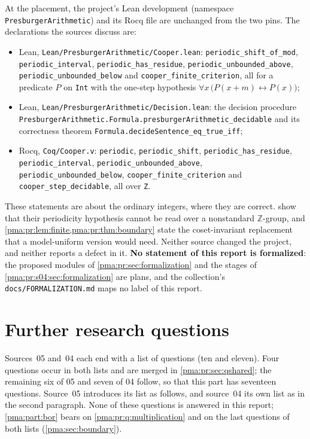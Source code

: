 \documentclass[11pt]{article}
\numberwithin{equation}{section}
\theoremstyle{definition}
\theoremstyle{remark}
\newcommand{\Z}{\mathbb Z}
\newcommand{\fn}[1]{\nolinkurl{#1}}
\begin{document}
At the placement, the project's Lean development (namespace
\texttt{PresburgerArithmetic}) and its Rocq file are unchanged from the two
pins. The declarations the sources discuss are:
\begin{itemize}
\item Lean, \fn{Lean/PresburgerArithmetic/Cooper.lean}:
\fn{periodic_shift_of_mod}, \fn{periodic_interval},
\fn{periodic_has_residue}, \fn{periodic_unbounded_above},
\fn{periodic_unbounded_below} and \fn{cooper_finite_criterion}, all
for a predicate $P$ on \fn{Int} with the one-step hypothesis
$\forall x\,\bigl(P(x+m)\leftrightarrow P(x)\bigr)$;
\item Lean, \fn{Lean/PresburgerArithmetic/Decision.lean}: the decision
procedure \fn{PresburgerArithmetic.Formula.presburgerArithmetic_decidable}
and its correctness theorem \fn{Formula.decideSentence_eq_true_iff};
\item Rocq, \fn{Coq/Cooper.v}: \fn{periodic}, \fn{periodic_shift},
\fn{periodic_has_residue}, \fn{periodic_interval},
\fn{periodic_unbounded_above}, \fn{periodic_unbounded_below},
\fn{cooper_finite_criterion} and \fn{cooper_step_decidable}, all
over \fn{Z}.
\end{itemize}
These statements are about the ordinary integers, where they are correct.
 show that their
periodicity hypothesis cannot be read over a nonstandard $\Z$-group, and
\cref{pma:pr:lem:finite,pma:pr:thm:boundary} state the coset-invariant
replacement that a model-uniform version would need. Neither source changed
the project, and neither reports a defect in it. \textbf{No statement of this
report is formalized}: the proposed modules of
\cref{pma:pr:sec:formalization} and the stages of
\cref{pma:pr:s04:sec:formalization} are plans, and the collection's
\fn{docs/FORMALIZATION.md} maps no label of this report.

\section{Further research questions}\label{pma:pr:sec:questions}\label{pma:pr:s04:sec:questions}

Sources~05 and~04 each end with a list of questions (ten and eleven). Four
questions occur in both lists and are merged in \cref{pma:pr:sec:qshared};
the remaining six of 05 and seven of 04 follow, so that this part has
seventeen questions. Source~05 introduces its list as follows, and source~04
its own list as in the second paragraph. None of these questions is answered
in this report; \cref{pma:part:bor} bears on \cref{pma:pr:q:multiplication}
and on the last questions of both lists (\cref{pma:sec:boundary}).
\end{document}
